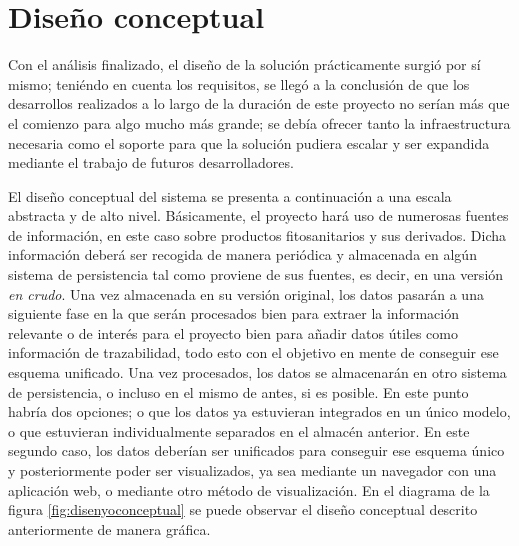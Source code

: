 \section{Diseño conceptual} \label{disenyo.conceptual}
Con el análisis finalizado, el diseño de la solución prácticamente surgió por sí mismo; teniéndo en cuenta los requisitos, se llegó a la conclusión de que los desarrollos realizados a lo largo de la duración de este proyecto no serían más que el comienzo para algo mucho más grande; se debía ofrecer tanto la infraestructura necesaria como el soporte para que la solución pudiera escalar y ser expandida mediante el trabajo de futuros desarrolladores. 
\par 
El diseño conceptual del sistema se presenta a continuación a una escala abstracta y de alto nivel. Básicamente, el proyecto hará uso de numerosas fuentes de información, en este caso sobre productos fitosanitarios y sus derivados. Dicha información deberá ser recogida de manera periódica y almacenada en algún sistema de persistencia tal como proviene de sus fuentes, es decir, en una versión \textit{en crudo}. Una vez almacenada en su versión original, los datos pasarán a una siguiente fase en la que serán procesados bien para extraer la información relevante o de interés para el proyecto bien para añadir datos útiles como información de trazabilidad, todo esto con el objetivo en mente de conseguir ese esquema unificado. Una vez procesados, los datos se almacenarán en otro sistema de persistencia, o incluso en el mismo de antes, si es posible. En este punto habría dos opciones; o que los datos ya estuvieran integrados en un único modelo, o que estuvieran individualmente separados en el almacén anterior. En este segundo caso, los datos deberían ser unificados para conseguir ese esquema único y posteriormente poder ser visualizados, ya sea mediante un navegador con una aplicación web, o mediante otro método de visualización. En el diagrama de la figura \ref{fig:disenyoconceptual} se puede observar el diseño conceptual descrito anteriormente de manera gráfica. 


